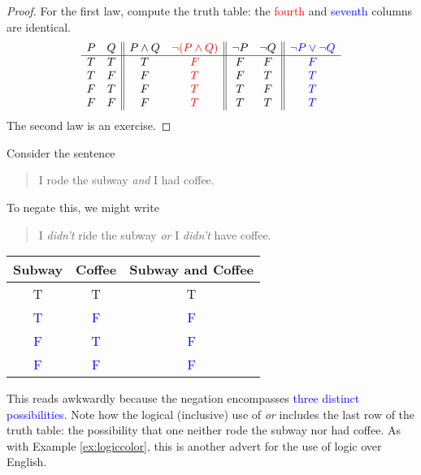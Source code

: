 \begin{proof}
	For the first law, compute the truth table: the \textcolor{red}{fourth} and \textcolor{blue}{seventh} columns are identical.
	\[
		\begin{array}[t]{cc||cc||cc||c}
			P & Q & P\wedge Q & \textcolor{red}{\neg(P\wedge Q)} & \neg P & \neg Q & \textcolor{blue}{\neg P\vee\neg Q}\\\hline
			T & T & T & \textcolor{red}{F} & F & F & \textcolor{blue}{F}\\
			T & F & F & \textcolor{red}{T} & F & T & \textcolor{blue}{T}\\
			F & T & F & \textcolor{red}{T} & T & F & \textcolor{blue}{T}\\
			F & F & F & \textcolor{red}{T} & T & T & \textcolor{blue}{T}
		\end{array}
	\]
	The second law is an exercise.
\end{proof}

\begin{example}{}{}
	Consider the sentence\par
	\begin{minipage}[t]{0.57\linewidth}\vspace{-1pt}
		\begin{quote}
			I rode the subway \emph{and} I had coffee.
		\end{quote}
		To negate this, we might write
		\begin{quote}
			I \emph{didn't} ride the subway \emph{or} I \emph{didn't} have coffee.
		\end{quote}
	\end{minipage}
	\hfill
	\begin{minipage}[t]{0.42\linewidth}\vspace{-20pt}
		\flushright	
		\begin{tabular}{c|c||c@{}}
			Subway&Coffee&Subway and Coffee\\\hline\hline
			T & T & T\\
			\textcolor{blue}{T} & \textcolor{blue}{F} & \textcolor{blue}{F}\\
			\textcolor{blue}{F} & \textcolor{blue}{T} & \textcolor{blue}{F}\\
			\textcolor{blue}{F} & \textcolor{blue}{F} &\textcolor{blue}{F}
		\end{tabular}
	\end{minipage}\bigbreak
	
	This reads awkwardly because the negation encompasses \textcolor{blue}{three distinct possibilities}. Note how the logical (inclusive) use of \emph{or} includes the last row of the truth table: the possibility that one neither rode the subway nor had coffee. As with Example \ref{ex:logiccolor}, this is another advert for the use of logic over English.
\end{example}



